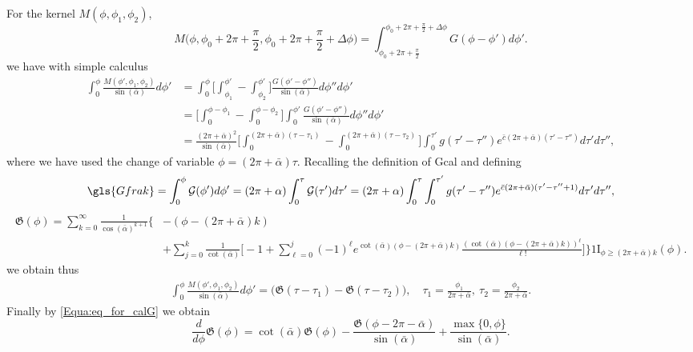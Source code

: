 \documentclass[reqno]{amsart}
\theoremstyle{definition} \newtheorem{definition}{Definition}[section]
\theoremstyle{definition} \newtheorem{remark}[definition]{Remark}
\theoremstyle{plain} \newtheorem{lemma}[definition]{Lemma}
\theoremstyle{plain} \newtheorem{proposition}[definition]{Proposition}
\theoremstyle{plain} \newtheorem{theorem}[definition]{Theorem}
\theoremstyle{plain} \newtheorem{corollary}[definition]{Corollary}
\theoremstyle{definition} \newtheorem{example}[definition]{Example}
\theoremstyle{plain} \newtheorem{claim}[clai]{Claim}
\theoremstyle{definition} \newtheorem{assumption}[definition]{Assumption}
\theoremstyle{definition} \newtheorem{observation}[definition]{Observation}
\newcommand{\ind}{1\!\!\mathrm{I}}
\newcommand{\1}{\mathbbm 1}
\numberwithin{equation}{section} %
\theoremstyle{plain} \newtheorem*{theorem*}{Theorem}
\theoremstyle{plain} \newtheorem{mthm}[maintheorem]{Main Theorem}
\theoremstyle{plain} \newtheorem*{mthm*}{Main Theorem}
\theoremstyle{plain} \newtheorem*{conjecture*}{Conjecture}
\theoremstyle{plain} \newtheorem{conjecture}[definition]{Conjecture}
\theoremstyle{plain} \newtheorem*{problem*}{Problem}
\begin{document}
For the kernel $M(\phi,\phi_1,\phi_2)$,
\begin{equation*}
M \bigg( \phi,\phi_0 + 2\pi + \frac{\pi}{2}, \phi_0 + 2\pi + \frac{\pi}{2} + \Delta \phi \bigg) = \int_{\phi_0 + 2\pi + \frac{\pi}{2}}^{\phi_0 + 2\pi + \frac{\pi}{2} + \Delta \phi} G(\phi - \phi') d\phi'.
\end{equation*}
we have with simple calculus
\begin{align*}
\int_0^\phi \frac{M(\phi',\phi_1,\phi_2)}{\sin(\bar \alpha)} d\phi' &= \int_{0}^\phi \bigg[ \int_{\phi_1}^{\phi'} - \int_{\phi_2}^{\phi'} \bigg] \frac{G(\phi' - \phi'')}{\sin(\bar \alpha)} d\phi'' d\phi' \\
&= \bigg[ \int_0^{\phi - \phi_1} - \int_0^{\phi - \phi_2} \bigg] \int_0^{\phi'} \frac{G(\phi' - \phi'')}{\sin(\bar \alpha)} d\phi'' d\phi' \\
&= \frac{(2\pi + \bar \alpha)^2}{\sin(\bar \alpha)} \bigg[ \int_0^{(2\pi + \bar \alpha)(\tau - \tau_1)} - \int_0^{(2\pi + \bar \alpha)(\tau - \tau_2)} \bigg] \int_0^{\tau'} g(\tau' - \tau'') e^{\bar c(2\pi + \bar \alpha) (\tau' - \tau'')} d\tau' d\tau'',
\end{align*}
where we have used the change of variable $\phi = (2\pi + \bar \alpha) \tau$. Recalling the definition of \gls{Gcal} and defining 
\begin{equation*}
\gls{Gfrak} = \int_0^\phi \mathcal G(\phi') d\phi' = (2\pi + \alpha) \int_0^\tau \mathcal G(\tau') d\tau' = (2\pi + \alpha) \int_0^\tau \int_0^{\tau'} g(\tau' - \tau'') e^{\bar c(2\pi + \bar \alpha)(\tau' - \tau'' + 1)} d\tau' d\tau'',
\end{equation*}
\begin{equation*}
\begin{split}
\mathfrak G(\phi) = \sum_{k=0}^\infty \frac{1}{\cos(\bar\alpha)^{k+1}} \Bigg\{& - (\phi - (2\pi + \bar\alpha) k) \\
& + \sum_{j = 0}^k \frac{1}{\cot(\bar\alpha)} \bigg[ -1 + \sum_{\ell = 0}^j (-1)^\ell e^{\cot(\bar\alpha) (\phi - (2\pi + \bar\alpha)k)} \frac{(\cot(\bar\alpha) (\phi - (2\pi +\bar \alpha) k))^\ell}{\ell!} \bigg] \Bigg\} \ind_{\phi \geq (2\pi + \bar\alpha) k}(\phi).
\end{split}
\end{equation*}
we obtain thus
\begin{align*}
\int_0^\phi \frac{M(\phi',\phi_1,\phi_2)}{\sin(\bar \alpha)}d\phi' = \big( \mathfrak G(\tau - \tau_1) - \mathfrak G(\tau - \tau_2) \big), \quad \tau_1 = \frac{\phi_1}{2\pi + \bar \alpha}, \ \tau_2 = \frac{\phi_2}{2\pi + \bar \alpha}.
\end{align*}
Finally by \eqref{Equa:eq_for_calG} we obtain
\begin{equation}
\label{Equa:eq_for_frakG}
\frac{d}{d\phi} \mathfrak G(\phi) = \cot(\bar \alpha) \mathfrak G(\phi) - \frac{\mathfrak G(\phi - 2\pi - \bar \alpha)}{\sin(\bar \alpha)} + \frac{\max\{0,\phi\}}{\sin(\bar \alpha)}.
\end{equation}
\end{document}
